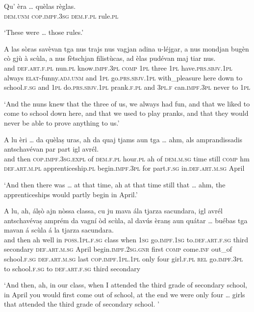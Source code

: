 \begin{linenumbers}
\gll    Qu’ èra … quèlas règlas.\\
 \textsc{dem.unm} \textsc{cop.impf.3sg} {} \textsc{dem.f.pl} rule.\textsc{pl}\\
\end{linenumbers}
\medskip
\glt `These were … those rules.'
\medskip

\begin{linenumbers}
\gll    A las sòras savèvan tga nus trajs nus vagjan adina u-léjgar, a nus mondjan bugèn cò gjù à scùla, a nus fètschjan filistùcas, ad èlas pudévan maj tiar nus.\\
and \textsc{def.art.f.pl} nun.\textsc{pl} know.\textsc{impf.3pl} \textsc{comp} \textsc{1pl} three \textsc{1pl} have.\textsc{prs.sbjv.1pl} always \textsc{elat}-funny.\textsc{adj.unm} and \textsc{1pl} go.\textsc{prs.sbjv.1pl} with\_pleasure here down to school.\textsc{f.sg} and \textsc{1pl} do.\textsc{prs.sbjv.1pl} prank.\textsc{f.pl} and \textsc{3pl.f} can.\textsc{impf.3pl} never to \textsc{1pl}\\
\end{linenumbers}
\medskip
\glt `And the nuns knew that the three of us, we always had fun, and that we liked to come to school down here, and that we used to play pranks, and that they would never be able to prove anything to us.'
\medskip

\begin{linenumbers}
\gll A lu èri … da quèlaṣ uras, ah da quaj tjams aun tga … ahm, als amprandissadis antschavévan par part igl avrél.\\
and then \textsc{cop.impf.3sg.expl} {} of \textsc{dem.f.pl} hour.\textsc{pl} ah of \textsc{dem.m.sg} time still  \textsc{comp} {} hm \textsc{def.art.m.pl} apprenticeship.\textsc{pl} begin.\textsc{impf.3pl} for part.\textsc{f.sg} in.\textsc{def.art.m.sg} April\\
\end{linenumbers}
\medskip
\glt `And then there was … at that time, ah at that time still that … ahm, the apprenticeships would partly begin in April.'
\medskip

\begin{linenumbers}
\gll A lu, ah, álṣò ajn nòssa classa, cu ju mava ála tjarza sacundara, igl avrél antschavévaṣ amprém da vagní òd scùla, al davús èranṣ aun quátar … buébas tga mavan á scùla á la tjarza sacundara.\\
and then ah well in \textsc{poss.1pl.f.sg} class when \textsc{1sg} go.\textsc{impf.1sg} to.\textsc{def.art.f.sg} third secondary \textsc{def.art.m.sg} April begin.\textsc{impf.2sg.gnr} first \textsc{comp} come.\textsc{inf} out\_of school.\textsc{f.sg} \textsc{def.art.m.sg} last \textsc{cop.impf.1pl.1pl}  only four {} girl.\textsc{f.pl} \textsc{rel} go.\textsc{impf.3pl} to school.\textsc{f.sg} to \textsc{def.art.f.sg} third secondary\\
\end{linenumbers}
\medskip
\glt `And then, ah, in our class, when I attended the third grade of secondary school, in April you would first come out of school, at the end we were only four … girls that attended the third grade of secondary school. '
\medskip

